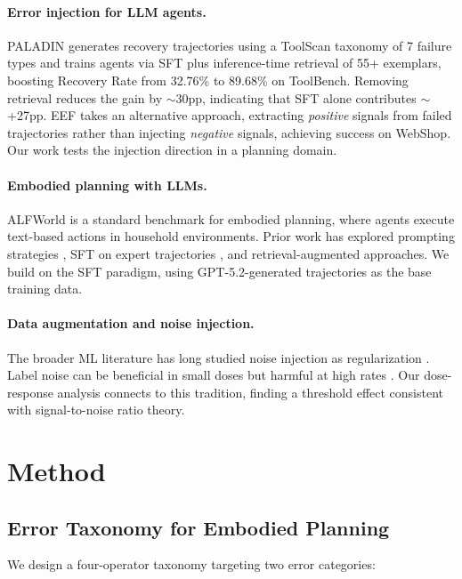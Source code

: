 \documentclass[11pt,a4paper]{article}
\begin{document}
\paragraph{Error injection for LLM agents.} PALADIN \cite{chen2025paladin} generates recovery trajectories using a ToolScan taxonomy of 7 failure types and trains agents via SFT plus inference-time retrieval of 55+ exemplars, boosting Recovery Rate from 32.76\% to 89.68\% on ToolBench. Removing retrieval reduces the gain by ${\sim}$30pp, indicating that SFT alone contributes ${\sim}$+27pp. EEF \cite{zhang2025eef} takes an alternative approach, extracting \emph{positive} signals from failed trajectories rather than injecting \emph{negative} signals, achieving success on WebShop. Our work tests the injection direction in a planning domain.

\paragraph{Embodied planning with LLMs.} ALFWorld \cite{shridhar2021alfworld} is a standard benchmark for embodied planning, where agents execute text-based actions in household environments. Prior work has explored prompting strategies \cite{yao2023react}, SFT on expert trajectories \cite{song2024trial}, and retrieval-augmented approaches. We build on the SFT paradigm, using GPT-5.2-generated trajectories as the base training data.

\paragraph{Data augmentation and noise injection.} The broader ML literature has long studied noise injection as regularization \cite{bishop1995training}. Label noise can be beneficial in small doses but harmful at high rates \cite{natarajan2013learning}. Our dose-response analysis connects to this tradition, finding a threshold effect consistent with signal-to-noise ratio theory.

\section{Method}

\subsection{Error Taxonomy for Embodied Planning}

We design a four-operator taxonomy targeting two error categories:
\end{document}

